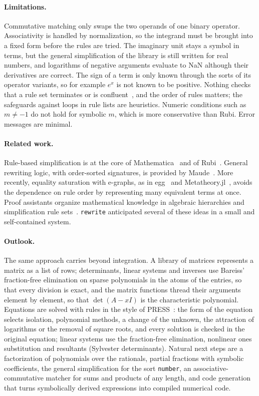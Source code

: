 \documentclass[11pt,a4paper]{article}
\begin{document}
\paragraph{Limitations.} Commutative matching only swaps the two operands
of one binary operator. Associativity is handled by normalization, so the
integrand must be brought into a fixed form before the rules are tried.
The imaginary unit stays a symbol in terms, but the
general simplification of the library is still written for real numbers,
and logarithms of negative arguments evaluate to NaN although their
derivatives are correct. The sign of a term is only known through the
sorts of its operator variants, so for example $e^x$ is not known to be
positive. Nothing checks that a rule set
terminates or is confluent~\cite{baader1998term}, and the order of rules
matters; the safeguards against loops in rule lists are heuristics.
Numeric conditions such as $m\ne-1$ do not hold for symbolic $m$, which is
more conservative than Rubi. Error messages are minimal.

\paragraph{Related work.} Rule-based simplification is at the core of
Mathematica~\cite{mathematica} and of Rubi~\cite{rich2018rubi}. General
rewriting logic, with order-sorted signatures, is provided by
Maude~\cite{clavel2007maude,goguen1992osa}. More recently, equality
saturation with e-graphs, as in egg~\cite{willsey2021egg} and
Metatheory.jl~\cite{cheli2021metatheory}, avoids the dependence on rule
order by representing many equivalent terms at once. Proof assistants
organize mathematical knowledge in algebraic hierarchies and simplification
rule sets~\cite{mathlib2020}. \texttt{rewrite} anticipated several of these
ideas in a small and self-contained system.

\paragraph{Outlook.} The same approach carries beyond integration. A
library of matrices represents a matrix as a list of rows;
determinants, linear systems and inverses use Bareiss' fraction-free
elimination on sparse polynomials in the atoms of the entries, so that
every division is exact, and the matrix functions thread their arguments
element by element, so that $\det(A-x I)$ is the characteristic
polynomial. Equations are
solved with rules in the style of PRESS~\cite{bundy1981press}: the form of
the equation selects isolation, polynomial methods, a change of the
unknown, the attraction of logarithms or the removal of square roots, and
every solution is checked in the original equation; linear systems use the
fraction-free elimination, nonlinear ones substitution and resultants
(Sylvester determinants). Natural next steps are a
factorization of polynomials over the rationals, partial fractions with
symbolic coefficients, the general simplification for the sort
\texttt{number}, an associative-commutative matcher for sums and products
of any length, and code generation that turns symbolically derived
expressions into compiled numerical code.
\end{document}
